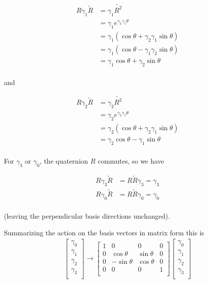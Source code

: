 \documentclass{article}
\begin{document}
\begin{align*}
R \gamma_1 \tilde{R}
&=
\gamma_1 \tilde{R^2} \\
&=
\gamma_1 e^{\gamma_2 \gamma_1 \theta} \\
&=
\gamma_1 (\cos\theta + \gamma_2 \gamma_1 \sin\theta) \\
&=
\gamma_1 (\cos\theta - \gamma_1 \gamma_2 \sin\theta) \\
&=
\gamma_1 \cos\theta + \gamma_2 \sin\theta \\
\end{align*}

and 

\begin{align*}
R \gamma_2 \tilde{R}
&=
\gamma_2 \tilde{R^2} \\
&=
\gamma_2 e^{\gamma_2 \gamma_1 \theta} \\
&=
\gamma_2 (\cos\theta + \gamma_2 \gamma_1 \sin\theta) \\
&=
\gamma_2 \cos\theta - \gamma_1 \sin\theta \\
\end{align*}

For $\gamma_3$ or $\gamma_0$, the quaternion $R$ commutes, so we have

\begin{align*}
R \gamma_3 \tilde{R} &= R \tilde{R} \gamma_3 = \gamma_3 \\
R \gamma_0 \tilde{R} &= R \tilde{R} \gamma_0 = \gamma_0 \\
\end{align*}

(leaving the perpendicular basis directions unchanged).

Summarizing the action on the basis vectors in matrix form this is
\begin{align*}
\begin{bmatrix}
\gamma_0 \\
\gamma_1 \\
\gamma_2 \\
\gamma_3 \\
\end{bmatrix}
\rightarrow
\begin{bmatrix}
1 & 0 & 0 & 0 \\
0 & \cos\theta & \sin\theta & 0 \\
0 & -\sin\theta & \cos\theta & 0 \\
0 & 0 & 0 & 1 \\
\end{bmatrix}
\begin{bmatrix}
\gamma_0 \\
\gamma_1 \\
\gamma_2 \\
\gamma_3 \\
\end{bmatrix}
\end{align*}
\end{document}
